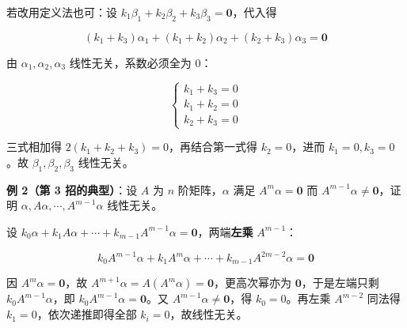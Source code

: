 \documentclass[11pt,openany,UTF8]{ctexbook}
\begin{document}
若改用定义法也可：设 $k_1\beta_1+k_2\beta_2+k_3\beta_3=\mathbf{0}$，代入得

\[(k_1+k_3)\alpha_1+(k_1+k_2)\alpha_2+(k_2+k_3)\alpha_3=\mathbf{0}\]

由 $\alpha_1,\alpha_2,\alpha_3$ 线性无关，系数必须全为 $0$：

\[\begin{cases} k_1+k_3=0 \\ k_1+k_2=0 \\ k_2+k_3=0 \end{cases}\]

三式相加得 $2(k_1+k_2+k_3)=0$，再结合第一式得 $k_2=0$，进而 $k_1=0,k_3=0$。故 $\beta_1,\beta_2,\beta_3$ 线性无关。

\textbf{例 2（第 3 招的典型）}：设 $A$ 为 $n$ 阶矩阵，$\alpha$ 满足 $A^{m}\alpha=\mathbf{0}$ 而 $A^{m-1}\alpha\ne\mathbf{0}$，证明 $\alpha,A\alpha,\cdots,A^{m-1}\alpha$ 线性无关。

设 $k_0\alpha+k_1A\alpha+\cdots+k_{m-1}A^{m-1}\alpha=\mathbf{0}$，两端\textbf{左乘} $A^{m-1}$：

\[k_0A^{m-1}\alpha+k_1A^{m}\alpha+\cdots+k_{m-1}A^{2m-2}\alpha=\mathbf{0}\]

因 $A^m\alpha=\mathbf{0}$，故 $A^{m+1}\alpha=A(A^m\alpha)=\mathbf{0}$，更高次幂亦为 $\mathbf{0}$，于是左端只剩 $k_0A^{m-1}\alpha$，即 $k_0A^{m-1}\alpha=\mathbf{0}$。又 $A^{m-1}\alpha\ne\mathbf{0}$，得 $k_0=0$。再左乘 $A^{m-2}$ 同法得 $k_1=0$，依次递推即得全部 $k_i=0$，故线性无关。
\end{document}
